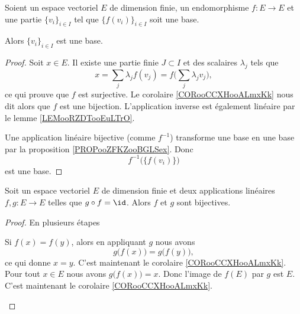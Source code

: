 \begin{proposition}     \label{PROPooHLUYooNsDgbn}
	Soient un espace vectoriel \( E\) de dimension finie, un endomorphisme \( f\colon E\to E\) et une partie \( \{v_i\}_{i\in I}\) tel que \( \{f(v_i)\}_{i\in I}\) soit une base.

	Alors \( \{v_i\}_{i\in I}\) est une base.
\end{proposition}

\begin{proof}
	Soit \( x\in E\). Il existe une partie finie \( J\subset I\) et des scalaires \( \lambda_j\) tels que
	\begin{equation}
		x=\sum_j\lambda_jf(v_j)=f\big( \sum_j\lambda_jv_j \big),
	\end{equation}
	ce qui prouve que \( f\) est surjective. Le corolaire \ref{CORooCCXHooALmxKk} nous dit alors que \( f\) est une bijection. L'application inverse est également linéaire par le lemme \ref{LEMooRZDTooEuLTrO}.

	Une application linéaire bijective (comme \( f^{-1}\)) transforme une base en une base par la proposition \ref{PROPooZFKZooBGLSex}. Donc
	\begin{equation}
		f^{-1}\big( \{f(v_i)\} \big)
	\end{equation}
	est une base.
\end{proof}

\begin{proposition}     \label{PROPooADESooATJSrH}
	Soit un espace vectoriel \( E\) de dimension finie et deux applications linéaires \( f,g\colon E\to E\) telles que \( g\circ f=\id\). Alors \( f\) et \( g\) sont bijectives.
\end{proposition}

\begin{proof}
	En plusieurs étapes
	\begin{subproof}
		Si \( f(x)=f(y)\), alors en appliquant \( g\) nous avons
		\begin{equation}
			g\big( f(x) \big)=g\big( f(y) \big),
		\end{equation}
		ce qui donne \( x=y\).
		C'est maintenant le corolaire \ref{CORooCCXHooALmxKk}.
		Pour tout \( x\in E\) nous avons \( g\big( f(x) \big)=x\). Donc l'image de \( f(E)\) par \( g\) est \( E\).
		C'est maintenant le corolaire \ref{CORooCCXHooALmxKk}.
	\end{subproof}
\end{proof}

